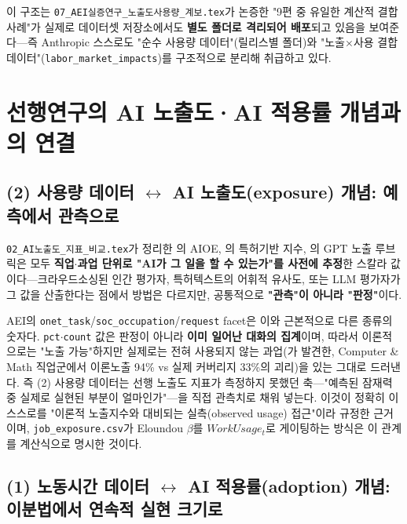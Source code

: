 \documentclass[11pt]{article}
\begin{document}
이 구조는 \texttt{07\_AEI실증연구\_노출도사용량\_계보.tex}가 논증한 "9편 중 유일한 계산적 결합 사례"가 실제로 데이터셋 저장소에서도 \textbf{별도 폴더로 격리되어 배포}되고 있음을 보여준다---즉 Anthropic 스스로도 "순수 사용량 데이터"(릴리스별 폴더)와 "노출$\times$사용 결합 데이터"(\texttt{labor\_market\_impacts})를 구조적으로 분리해 취급하고 있다.

\section{선행연구의 AI 노출도·AI 적용률 개념과의 연결}
\label{sec:link}

\subsection{(2) 사용량 데이터 $\leftrightarrow$ AI 노출도(exposure) 개념: 예측에서 관측으로}

\texttt{02\_AI노출도\_지표\_비교.tex}가 정리한 \citet{felten-2021-occupational-industry-and-geographic-exposure}의 AIOE, \citet{webb-2020-impact-artificial-intelligence-labor}의 특허기반 지수, \citet{eloundou-2023-gpts-are-gpts-an-early}의 GPT 노출 루브릭은 모두 \textbf{직업$\cdot$과업 단위로 "AI가 그 일을 할 수 있는가"를 사전에 추정}한 스칼라 값이다---크라우드소싱된 인간 평가자, 특허텍스트의 어휘적 유사도, 또는 LLM 평가자가 그 값을 산출한다는 점에서 방법은 다르지만, 공통적으로 \textbf{"관측"이 아니라 "판정"}이다.

AEI의 \texttt{onet\_task}/\texttt{soc\_occupation}/\texttt{request} facet은 이와 근본적으로 다른 종류의 숫자다. \texttt{pct}$\cdot$\texttt{count} 값은 판정이 아니라 \textbf{이미 일어난 대화의 집계}이며, 따라서 이론적으로는 "노출 가능"하지만 실제로는 전혀 사용되지 않는 과업(\citealp{massenkoff-2026-labor-market-impacts-of-ai}가 발견한, Computer \& Math 직업군에서 이론노출 94\% vs 실제 커버리지 33\%의 괴리)을 있는 그대로 드러낸다. 즉 (2) 사용량 데이터는 선행 노출도 지표가 측정하지 못했던 축---"예측된 잠재력 중 실제로 실현된 부분이 얼마인가"---을 직접 관측치로 채워 넣는다. 이것이 정확히 \citet{handa-2025-which-economic-tasks-are}이 스스로를 "이론적 노출지수와 대비되는 실측(observed usage) 접근"이라 규정한 근거이며, \texttt{job\_exposure.csv}가 Eloundou $\beta$를 $WorkUsage_t$로 게이팅하는 방식은 이 관계를 계산식으로 명시한 것이다.

\subsection{(1) 노동시간 데이터 $\leftrightarrow$ AI 적용률(adoption) 개념: 이분법에서 연속적 실현 크기로}
\end{document}
